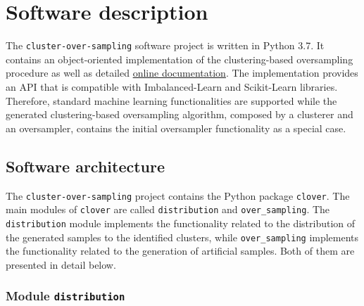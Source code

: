 \documentclass[preprint,12pt, a4paper]{elsarticle}
\begin{document}
\section{Software description}
\label{software-description}

The \texttt{cluster-over-sampling} software project is written in Python 3.7. It contains an object-oriented implementation of the clustering-based oversampling procedure as well as detailed \href{https://cluster-over-sampling.readthedocs.io/}{online documentation}. The implementation provides an API that is compatible with Imbalanced-Learn and Scikit-Learn libraries. Therefore, standard machine learning functionalities are supported while the generated clustering-based oversampling algorithm, composed by a clusterer and an oversampler, contains the initial oversampler functionality as a special case.

\subsection{Software architecture}
\label{architecture}

The \texttt{cluster-over-sampling} project contains the Python package \texttt{clover}. The main modules of \texttt{clover} are called \texttt{distribution} and \texttt{over\_sampling}. The \texttt{distribution} module implements the functionality related to the distribution of the generated samples to the identified clusters, while \texttt{over\_sampling} implements the functionality related to the generation of artificial samples. Both of them are presented in detail below.

\subsubsection{Module \texttt{distribution}}
\label{distribution}
\end{document}
